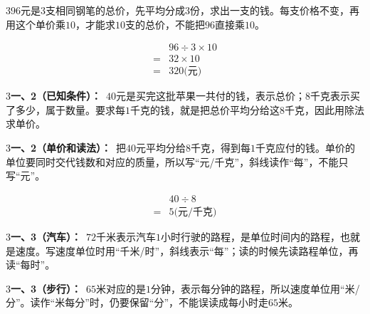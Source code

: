 \documentclass[multi=snippet,border={5bp 20bp 5bp 5bp}]{standalone}
\newenvironment{snippet}[3]{\begin{minipage}{#1bp}\color{answerred}\fontsize{#2}{#3}\selectfont\raggedright}{\end{minipage}}
\begin{document}
\begin{snippet}{505}{11.5}{14}\begin{multicols}{3}\raggedcolumns \(96\)\allowbreak 元是\(3\)\allowbreak 支相同钢笔的总价，先平均分成\(3\)\allowbreak 份，求出一支的钱。每支价格不变，再用这个单价乘\(10\)\allowbreak ，才能求\(10\)\allowbreak 支的总价，不能把\(96\)\allowbreak 直接乘\(10\)\allowbreak 。\par \[\begin{aligned}&96\div3\times10\\={}&32\times10\\={}&320\text{(元)}\end{aligned}\]\end{multicols}\end{snippet}
\begin{snippet}{505}{11.5}{14}\begin{multicols}{3}\raggedcolumns \textbf{一、2（已知条件）：}\ \(40\)\allowbreak 元是买完这批苹果一共付的钱，表示总价；\(8\)\allowbreak 千克表示买了多少，属于数量。要求每\(1\)\allowbreak 千克的钱，就是把总价平均分给这\(8\)\allowbreak 千克，因此用除法求单价。\end{multicols}\end{snippet}
\begin{snippet}{505}{11.5}{14}\begin{multicols}{3}\raggedcolumns \textbf{一、2（单价和读法）：}\ 把\(40\)\allowbreak 元平均分给\(8\)\allowbreak 千克，得到每\(1\)\allowbreak 千克应付的钱。单价的单位要同时交代钱数和对应的质量，所以写“元/千克”，斜线读作“每”，不能只写“元”。\par \[\begin{aligned}&40\div8\\={}&5\text{(元/千克)}\end{aligned}\]\end{multicols}\end{snippet}
\begin{snippet}{505}{11.5}{14}\begin{multicols}{3}\raggedcolumns \textbf{一、3（汽车）：}\ \(72\)\allowbreak 千米表示汽车\(1\)\allowbreak 小时行驶的路程，是单位时间内的路程，也就是速度。写速度单位时用“千米/时”，斜线表示“每”；读的时候先读路程单位，再读“每时”。\end{multicols}\end{snippet}
\begin{snippet}{505}{11.5}{14}\begin{multicols}{3}\raggedcolumns \textbf{一、3（步行）：}\ \(65\)\allowbreak 米对应的是\(1\)\allowbreak 分钟，表示每分钟的路程，所以速度单位用“米/分”。读作“米每分”时，仍要保留“分”，不能误读成每小时走\(65\)\allowbreak 米。\end{multicols}\end{snippet}
\end{document}
